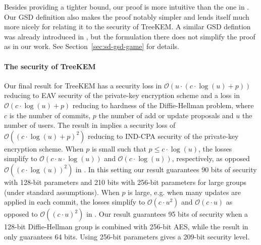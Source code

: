 Besides providing a tighter bound, our proof is more intuitive than the one in \cite{ttkem}. Our GSD definition also makes the proof notably simpler and lends itself much more nicely for relating it to the security of TreeKEM. A similar GSD defintion was already introduced in \cite{modular-group-messaging}, but the formulation there does not simplify the proof as in our work. See Section~\ref{sec:sd-gsd-game} for details.

\paragraph{The security of TreeKEM} Our final result for TreeKEM has a security loss in $\mathcal{O}(u \cdot (c \cdot \log(u) + p))$ reducing to EAV security of the private-key encryption scheme and a loss in $\mathcal{O}(c \cdot \log(u) + p)$ reducing to hardness of the Diffie-Hellman problem, where $c$ is the number of commits, $p$ the number of add or update proposals and $u$ the number of users. The result in \cite{ttkem} implies a security loss of $\mathcal{O}((c \cdot \log(u) + p)^2)$ reducing to IND-CPA security of the private-key encryption scheme.
When $p$ is small such that $p \le c \cdot \log(u)$, the losses simplify to $\mathcal{O}(c \cdot u \cdot \log(u))$ and $\mathcal{O}(c \cdot \log(u))$, respectively, as opposed $\mathcal{O}((c \cdot \log(u))^2)$ in \cite{ttkem}. In this setting our result guarantees 90 bits of security with 128-bit parameters and 210 bits with 256-bit parameters for large groups (under standard assumptions).
When $p$ is large, e.g. when many updates are applied in each commit, the losses simplify to $\mathcal{O}(c \cdot u^2)$ and $\mathcal{O}(c \cdot u)$ as opposed to $\mathcal{O}((c \cdot u)^2)$ in \cite{ttkem}. Our result guarantees 95 bits of security when a 128-bit Diffie-Hellman group is combined with 256-bit AES, while the result in \cite{ttkem} only guarantees 64 bits. Using 256-bit parameters gives a 209-bit security level.
